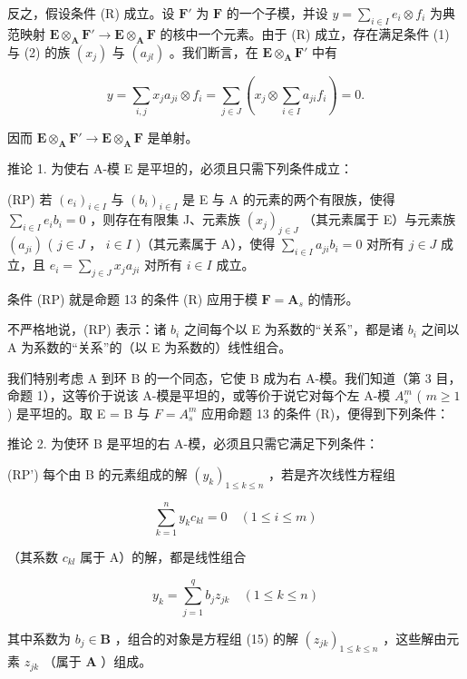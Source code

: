 反之，假设条件 (R) 成立。设 \(\mathbf{F}'\) 为 \(\mathbf{F}\) 的一个子模，并设 \(y = \sum_{i\in I}e_i\otimes f_i\) 为典范映射 \(\mathbf{E}\otimes_{\mathbf{A}}\mathbf{F}'\to \mathbf{E}\otimes_{\mathbf{A}}\mathbf{F}\) 的核中一个元素。由于 (R) 成立，存在满足条件 (1) 与 (2) 的族 \((x_j)\) 与 \((a_{jl})\) 。我们断言，在 \(\mathbf{E}\otimes_{\mathbf{A}}\mathbf{F}'\) 中有

\[
y = \sum_ {i, j} x _ {j} a _ {j i} \otimes f _ {i} = \sum_ {j \in J} (x _ {j} \otimes \sum_ {i \in I} a _ {j i} f _ {i}) = 0.
\]

因而 \(\mathbf{E} \otimes_{\mathbf{A}} \mathbf{F}' \to \mathbf{E} \otimes_{\mathbf{A}} \mathbf{F}\) 是单射。

推论 1. 为使右 A-模 E 是平坦的，必须且只需下列条件成立：

(RP) 若 \((e_i)_{i\in I}\) 与 \((b_i)_{i\in I}\) 是 E 与 A 的元素的两个有限族，使得 \(\sum_{i\in I}e_i b_i = 0\) ，则存在有限集 J、元素族 \((x_j)_{j\in J}\) （其元素属于 E）与元素族 \((a_{ji})\) ( \(j\in J\) ， \(i\in I\) )（其元素属于 A），使得 \(\sum_{i\in I}a_{ji}b_i = 0\) 对所有 \(j\in J\) 成立，且 \(e_i = \sum_{j\in J}x_j a_{ji}\) 对所有 \(i\in I\) 成立。

条件 (RP) 就是命题 13 的条件 (R) 应用于模 \(\mathbf{F} = \mathbf{A}_s\) 的情形。

不严格地说，(RP) 表示：诸 \(b_{i}\) 之间每个以 E 为系数的“关系”，都是诸 \(b_{i}\) 之间以 A 为系数的“关系”的（以 E 为系数的）线性组合。

我们特别考虑 A 到环 B 的一个同态，它使 B 成为右 A-模。我们知道（第 3 目，命题 1），这等价于说该 A-模是平坦的，或等价于说它对每个左 A-模 \(A_{s}^{m}\) ( \(m \geqslant 1\) ) 是平坦的。取 E = B 与 \(F = A_{s}^{m}\) 应用命题 13 的条件 (R)，便得到下列条件：

推论 2. 为使环 B 是平坦的右 A-模，必须且只需它满足下列条件：

(RP') 每个由 B 的元素组成的解 \((y_{k})_{1\leqslant k\leqslant n}\) ，若是齐次线性方程组

\[
\sum_ {k = 1} ^ {n} y _ {k} c _ {k l} = 0 \quad (1 \leqslant i \leqslant m)\tag{15}
\]

（其系数 \(c_{kl}\) 属于 A）的解，都是线性组合

\[
y _ {k} = \sum_ {j = 1} ^ {q} b _ {j} z _ {j k} \quad (1 \leqslant k \leqslant n)\tag{16}
\]

其中系数为 \(b_{j} \in \mathbf{B}\) ，组合的对象是方程组 (15) 的解 \((z_{jk})_{1 \leqslant k \leqslant n}\) ，这些解由元素 \(z_{jk}\) （属于 \(\mathbf{A}\) ）组成。

